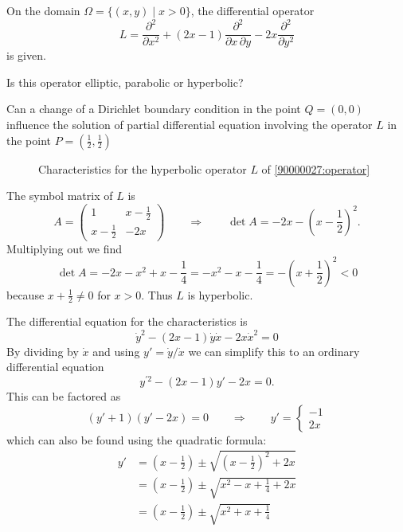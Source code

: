 On the domain $\Omega= \{(x,y)\mid x > 0\}$, the differential operator
\begin{equation}
L
=
\frac{\partial^2}{\partial x^2}
+
(2x-1)
\frac{\partial^2}{\partial x\,\partial y}
-
2x
\frac{\partial^2}{\partial y^2}
\label{90000027:operator}
\end{equation}
is given.
\begin{teilaufgaben}
\item
Is this operator elliptic, parabolic or hyperbolic?
\item
Can a change of a Dirichlet boundary condition in the point $Q=(0,0)$
influence the solution of partial differential equation involving the
operator $L$ in the point $P=(\frac12,\frac12)$
\end{teilaufgaben}

\begin{loesung}
\begin{figure}
\centering
{}
\caption{Characteristics for the hyperbolic operator $L$ of
\eqref{90000027:operator}
\label{90000027:fig}}
\end{figure}
\begin{teilaufgaben}
\item
The symbol matrix of $L$ is
\[
A
=
\begin{pmatrix}
  1       & x-\frac12 \\
x-\frac12 &   -2x
\end{pmatrix}
\qquad\Rightarrow\qquad
\det A
=
-2x -(x-{\textstyle\frac12})^2.
\]
Multiplying out we find
\[
\det A
=
-2x-x^2 +x-\frac14
=
-x^2-x-\frac14
=
-(x+{\textstyle\frac12})^2
<
0
\]
because $x+\frac12\ne 0$ for $x>0$.
Thus  $L$ is hyperbolic.
\item
The differential equation for the characteristics is
\[
\dot{y}^2 -(2x-1) \dot{y}\dot{x} - 2x\dot{x}^2 = 0
\]
By dividing by $\dot{x}$ and using $y'=\dot{y}/\dot{x}$ we can simplify
this to an ordinary differential equation
\[
y^{\prime 2} -(2x-1)y' - 2x = 0.
\]
This can be factored as
\[
(y'+1)(y'-2x) = 0
\qquad\Rightarrow\qquad
y'
=
\begin{cases}
-1\\
2x
\end{cases}
\]
which can also be found using the quadratic formula:
\begin{align*}
y'
&=
(x-{\textstyle\frac12}) \pm \sqrt{(x-{\textstyle\frac12})^2+2x}
\\
&=
(x-{\textstyle\frac12}) \pm \sqrt{x^2-x+\frac14+2x}
\\
&=
(x-{\textstyle\frac12}) \pm \sqrt{x^2+x+\frac14}

\end{align*}
\end{teilaufgaben}
\end{loesung}
